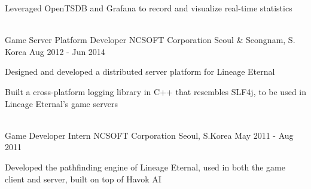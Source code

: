 \documentclass[12pt, a4paper]{awesome-cv}
\newif\iflong
\newcommand{\verbose}[1]{\iflong{#1}\fi}
\newcommand{\concise}[1]{\iflong\else{#1}\fi}
\newcommand{\shortlong}[2]{\iflong\textbf{#1}\xspace#2\else#1\fi}
\begin{document}
\begin{cventries}
{\begin{cvitems}
{				}
				\item \shortlong{Leveraged OpenTSDB and Grafana to record and visualize \verbose{the }real-time statistics}
				{of the various kinds of applications running in the distributed architecture. Using ring buffers, the systems were able to publish real-time metrics without affecting the performance, and they were reflected in the report within seconds, helping quickly identify the trends as well as any unexpected behaviors.}
				\verbose{\item Built and maintained a Jenkins cluster that runs mission-critical Hadoop jobs for the company's recommender systems.}
			\end{cvitems}
		}
		\concise{\\[-0.5em]}
		\cventry
		{Game Server Platform Developer}
		{NCSOFT Corporation}
		{Seoul \& Seongnam, S. Korea}
		{Aug 2012 - Jun 2014}
		{
			\begin{cvitems}
				\item \shortlong{Designed and developed a distributed server platform for Lineage Eternal}{, the company's upcoming massively multiplayer online role-playing game (MMORPG).
				The platform was composed of a number of fault-tolerant clusters of Java and C++ servers, built using Netty/RxJava and Boost ASIO for the asynchronous and nonblocking IO.
				Its goal was to make the game playable without requiring the users to select and be limited to only one among many game servers.}
				\item Built a cross-platform logging library in C++ that resembles SLF4j, to be used in Lineage Eternal's game servers\verbose{.}
				\verbose {\item Managed the Perforce source control server, which had millions of files being shared among the team of 100+ members.}
			\end{cvitems}
		}
		\concise{\\[-0.5em]}
		\cventry
		{Game Developer Intern}
		{NCSOFT Corporation}
		{Seoul, S.Korea}
		{May 2011 - Aug 2011}
		{
			\begin{cvitems}
				\item Developed the pathfinding engine of Lineage Eternal, used in both the game client and server, built on top of Havok AI\verbose{.}
			\end{cvitems} 
		}
		\verbose{
			\cventry
			{Educational Software Developer}
			{University of Michigan}
			{Ann Arbor, MI}
			{May 2010 - Aug 2010}
			{
				\begin{cvitems}
					\item Developed interactive educational software visualizing molecular movements in Processing, for the thermodynamics class.
				\end{cvitems} 
			}
		}
		\verbose{
			\cventry
			{Web Developer \& System Administrator}
			{Techno Press}
			{Daejeon, S. Korea}
			{Jan 2009 - Jun 2009}
			{
				\begin{cvitems}
					\item Developed a website for Techno Press, a publisher of international journals in the field of civil engineering.
				\end{cvitems} 
			}
		}
	\end{cventries}
	
\end{document}
